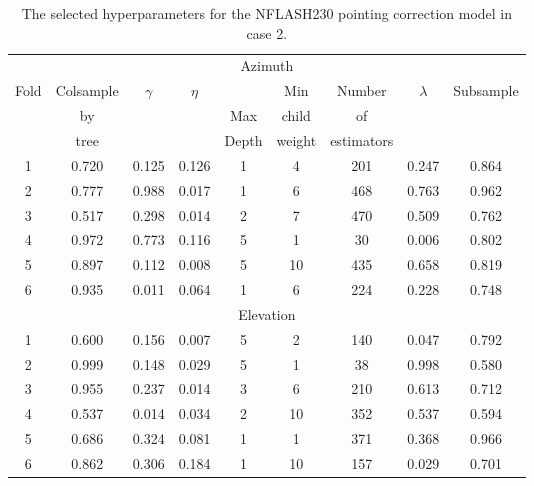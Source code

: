 \begin{table}[!htbp]
    \centering
    \caption{The selected hyperparameters for the NFLASH230 pointing correction model in case 2.}
    \begin{tabular}{ccccccccc}
        \toprule
        \multicolumn{9}{c}{Azimuth} \\
        \cmidrule{1-9}
        \multirow{3}{*}{Fold} &  Colsample &  \multirow{3}{*}{$\gamma$} &  \multirow{3}{*}{$\eta$} &   &  Min &  Number &  \multirow{3}{*}{$\lambda$} &  \multirow{3}{*}{Subsample} \\
        & by   & & & Max   & child  & of         & & \\
        & tree & & & Depth & weight & estimators & & \\
        \midrule
        1 &      0.720 &  0.125 &          0.126 &      1 &             4 &       201 &       0.247 &      0.864 \\
        2 &      0.777 &  0.988 &          0.017 &      1 &             6 &       468 &       0.763 &      0.962 \\
        3 &      0.517 &  0.298 &          0.014 &      2 &             7 &       470 &       0.509 &      0.762 \\
        4 &      0.972 &  0.773 &          0.116 &      5 &             1 &        30 &       0.006 &      0.802 \\
        5 &      0.897 &  0.112 &          0.008 &      5 &            10 &       435 &       0.658 &      0.819 \\
        6 &      0.935 &  0.011 &          0.064 &      1 &             6 &       224 &       0.228 &      0.748 \\
        \cmidrule{1-9}
        \multicolumn{9}{c}{Elevation} \\
        \cmidrule{1-9}
        1 &      0.600 &  0.156 &          0.007 &      5 &             2 &       140 &       0.047 &      0.792 \\
        2 &      0.999 &  0.148 &          0.029 &      5 &             1 &        38 &       0.998 &      0.580 \\
        3 &      0.955 &  0.237 &          0.014 &      3 &             6 &       210 &       0.613 &      0.712 \\
        4 &      0.537 &  0.014 &          0.034 &      2 &            10 &       352 &       0.537 &      0.594 \\
        5 &      0.686 &  0.324 &          0.081 &      1 &             1 &       371 &       0.368 &      0.966 \\
        6 &      0.862 &  0.306 &          0.184 &      1 &            10 &       157 &       0.029 &      0.701 \\
        \bottomrule
        \end{tabular}
        \label{tab:hyperparameters_nflash230_case2}
\end{table}


